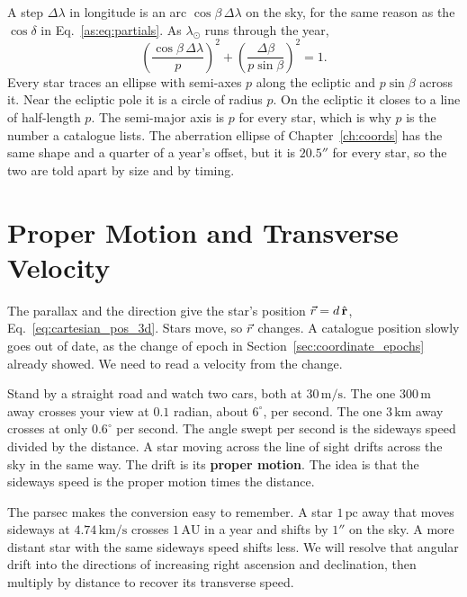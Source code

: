 A step $\Delta\lambda$ in longitude is an arc $\cos\beta\,\Delta\lambda$ on the sky, for the same reason as the $\cos\delta$ in Eq.~\eqref{as:eq:partials}. As $\lambda_\odot$ runs through the year,
\begin{equation}
	\boxed{\left(\frac{\cos\beta\,\Delta\lambda}{p}\right)^2+\left(\frac{\Delta\beta}{p\sin\beta}\right)^2=1 .}
	\label{as:eq:parallax_ellipse}
\end{equation}
Every star traces an ellipse with semi-axes $p$ along the ecliptic and $p\sin\beta$ across it. Near the ecliptic pole it is a circle of radius $p$. On the ecliptic it closes to a line of half-length $p$. The semi-major axis is $p$ for every star, which is why $p$ is the number a catalogue lists. The aberration ellipse of Chapter~\ref{ch:coords} has the same shape and a quarter of a year's offset, but it is $20.5''$ for every star, so the two are told apart by size and by timing.

\section{Proper Motion and Transverse Velocity}
\label{as:sec:proper_motion}

The parallax and the direction give the star's position $\vec r=d\,\hat{\mathbf r}$, Eq.~\eqref{eq:cartesian_pos_3d}. Stars move, so $\vec r$ changes. A catalogue position slowly goes out of date, as the change of epoch in Section~\ref{sec:coordinate_epochs} already showed. We need to read a velocity from the change.

Stand by a straight road and watch two cars, both at $30\,\mathrm{m/s}$. The one $300\,\mathrm m$ away crosses your view at $0.1$ radian, about $6^\circ$, per second. The one $3\,\mathrm{km}$ away crosses at only $0.6^\circ$ per second. The angle swept per second is the sideways speed divided by the distance. A star moving across the line of sight drifts across the sky in the same way. The drift is its \textbf{proper motion}. The idea is that the sideways speed is the proper motion times the distance.

The parsec makes the conversion easy to remember. A star $1\,\mathrm{pc}$ away that moves sideways at $4.74\,\mathrm{km/s}$ crosses $1\,\mathrm{AU}$ in a year and shifts by $1''$ on the sky. A more distant star with the same sideways speed shifts less. We will resolve that angular drift into the directions of increasing right ascension and declination, then multiply by distance to recover its transverse speed.

